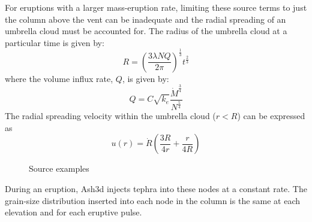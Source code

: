 For eruptions with a larger mass-eruption rate, limiting these source terms to just
the column above the vent can be inadequate and the radial spreading of an
umbrella cloud must be accounted for. The radius of the umbrella cloud at a
particular time is given by:
\begin{equation}
 R = \left( \frac{3 \lambda N Q}{2 \pi}\right)^{\frac{1}{3}} t^{\frac{2}{3}}  \label{EqUmbRad}
\end{equation}
where the volume influx rate, $Q$, is given by:
\begin{equation}
 Q = C \sqrt{k_e} \frac{\dot{M}^{\frac{3}{4}}}{N^{\frac{5}{4}}} \label{EqUmbQ}
\end{equation}
The radial spreading velocity within the umbrella cloud ($r<R$) can be expressed as
\begin{equation}
 u(r) = \dot{R} \left( \frac{3 R}{4 r} + \frac{r}{4R}\right) \label{EqUmbRadVelCost}
\end{equation}




\begin{figure}[htbp]
\parbox{15cm}{\caption{\label{FigSourceExample}
Source examples}}
\end{figure}

During an eruption, Ash3d injects tephra into these nodes at a constant
rate. The grain-size distribution inserted into each node in the column
is the same at each elevation and for each eruptive pulse.

